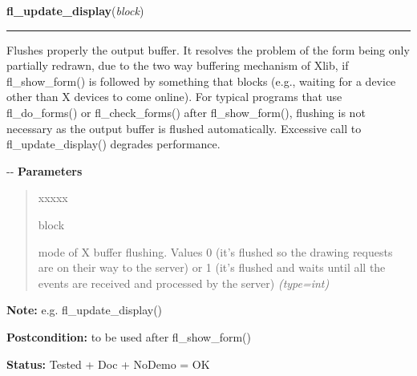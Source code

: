     \label{xformslib:flxbasic:fl_update_display}

    \vspace{0.5ex}

\hspace{.8\funcindent}\begin{boxedminipage}{\funcwidth}

    \raggedright \textbf{fl\_update\_display}(\textit{block})

    \vspace{-1.5ex}

    \rule{\textwidth}{0.5\fboxrule}
\setlength{\parskip}{2ex}

Flushes properly the output buffer. It resolves the problem of the
form being only partially redrawn, due to the two way buffering mechanism
of Xlib, if fl\_show\_form() is followed by something that blocks (e.g.,
waiting for a device other than X devices to come online). For typical
programs that use fl\_do\_forms() or fl\_check\_forms() after fl\_show\_form(),
flushing is not necessary as the output buffer is flushed automatically.
Excessive call to fl\_update\_display() degrades performance.

-{}-
\setlength{\parskip}{1ex}
      \textbf{Parameters}
      \vspace{-1ex}

      \begin{quote}
        \begin{Ventry}{xxxxx}

          \item[block]


mode of X buffer flushing. Values 0 (it's flushed so the drawing
requests are on their way to the server) or 1 (it's flushed and
waits until all the events are received and processed by the server)
            {\it (type=int)}

        \end{Ventry}

      \end{quote}

\textbf{Note:} 
e.g. fl\_update\_display()


\textbf{Postcondition:} 
to be used after fl\_show\_form()


\textbf{Status:} 
Tested + Doc + NoDemo = OK


    \end{boxedminipage}


